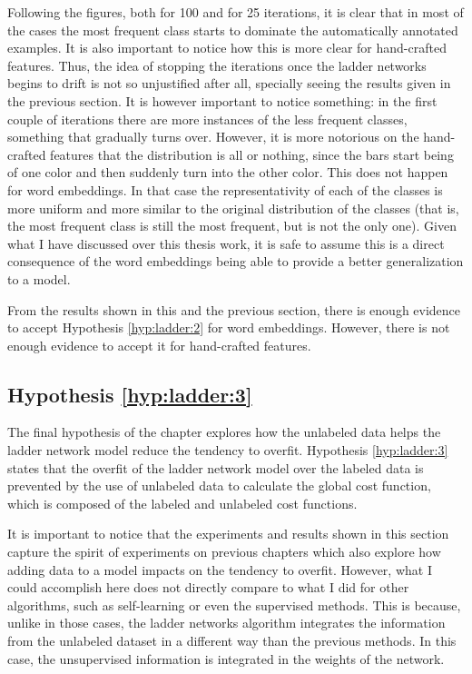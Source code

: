 Following the figures, both for 100 and for 25 iterations, it is clear that in
most of the cases the most frequent class starts to dominate the automatically
annotated examples. It is also important to notice how this is more clear for
hand-crafted features. Thus, the idea of stopping the iterations once the
ladder networks begins to drift is not so unjustified after all, specially
seeing the results given in the previous section. It is however important to
notice something: in the first couple of iterations there are more instances of
the less frequent classes, something that gradually turns over. However, it is
more notorious on the hand-crafted features that the distribution is all or
nothing, since the bars start being of one color and then suddenly turn into
the other color. This does not happen for word embeddings. In that case the
representativity of each of the classes is more uniform and more similar to the
original distribution of the classes (that is, the most frequent class is still
the most frequent, but is not the only one). Given what I have discussed over
this thesis work, it is safe to assume this is a direct consequence of the word
embeddings being able to provide a better generalization to a model.

From the results shown in this and the previous section, there is enough
evidence to accept Hypothesis \ref{hyp:ladder:2} for word embeddings. However,
there is not enough evidence to accept it for hand-crafted features.

\subsection{Hypothesis \ref{hyp:ladder:3}}\label{sec:ladder:hyp:3}

The final hypothesis of the chapter explores how the unlabeled data helps the
ladder network model reduce the tendency to overfit. Hypothesis
\ref{hyp:ladder:3} states that the overfit of the ladder network model over the
labeled data is prevented by the use of unlabeled data to calculate the global
cost function, which is composed of the labeled and unlabeled cost functions.

It is important to notice that the experiments and results shown in this
section capture the spirit of experiments on previous chapters which also
explore how adding data to a model impacts on the tendency to overfit.
However, what I could accomplish here does not directly compare to what I did
for other algorithms, such as self-learning or even the supervised methods.
This is because, unlike in those cases, the ladder networks algorithm
integrates the information from the unlabeled dataset in a different way than
the previous methods. In this case, the unsupervised information is integrated
in the weights of the network. 

